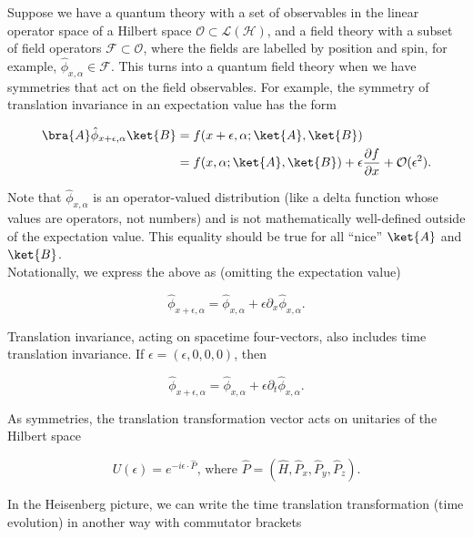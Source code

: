 
\noindent Suppose we have a quantum theory with a set of observables in the linear operator space of a Hilbert space $\mathcal{O} \subset \mathcal{L}(\mathcal{H})$, and a field theory with a subset of field operators $\mathcal{F} \subset \mathcal{O}$, where the fields are labelled by position and spin, for example, $\hat{\phi}_{x, \alpha} \in \mathcal{F}$. This turns into a quantum field theory when we have symmetries that act on the field observables. For example, the symmetry of translation invariance in an expectation value has the form

\begin{align}
\bra{A} \hat{\phi}_{x+\epsilon, \alpha} \ket{B} &= f(x+\epsilon, \alpha; \ket{A}, \ket{B}) \\
&= f(x, \alpha; \ket{A}, \ket{B}) + \epsilon \frac{\partial f}{\partial x} + \mathcal{O}(\epsilon^2).
\end{align}

\noindent Note that $\hat{\phi}_{x, \alpha}$ is an operator-valued distribution (like a delta function whose values are operators, not numbers) and is not mathematically well-defined outside of the expectation value. This equality should be true for all ``nice'' $\ket{A}$ and $\ket{B}$. \\

\noindent Notationally, we express the above as (omitting the expectation value)

\begin{equation}
\hat{\phi}_{x+\epsilon, \alpha} = \hat{\phi}_{x, \alpha} + \epsilon \partial_x \hat{\phi}_{x, \alpha}.
\end{equation}

\noindent Translation invariance, acting on spacetime four-vectors, also includes time translation invariance. If $\epsilon = (\epsilon, 0, 0, 0)$, then

\begin{equation}
\hat{\phi}_{x+\epsilon, \alpha} = \hat{\phi}_{x, \alpha} + \epsilon \partial_t \hat{\phi}_{x, \alpha}.
\end{equation}

\noindent As symmetries, the translation transformation vector acts on unitaries of the Hilbert space

\begin{equation}
U(\epsilon) = e^{-i\epsilon \cdot \hat{P}} \text{, where } \hat{P} = (\hat{H}, \hat{P}_x, \hat{P}_y, \hat{P}_z).
\end{equation}

\noindent In the Heisenberg picture, we can write the time translation transformation (time evolution) in another way with commutator brackets

